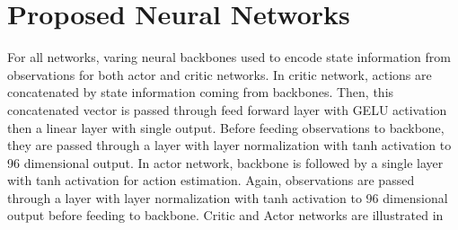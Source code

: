 \section{Proposed Neural Networks}
\label{sec:proposed_networks}

For all networks, varing neural backbones used to encode state information from observations for both actor and critic networks. 
In critic network, actions are concatenated by state information coming from backbones. 
Then, this concatenated vector is passed through feed forward layer with GELU activation then a linear layer with single output. 
Before feeding observations to backbone, they are passed through a layer with layer normalization with tanh activation to 96 dimensional output. 
In actor network, backbone is followed by a single layer with tanh activation for action estimation. 
Again, observations are passed through a layer with layer normalization with tanh activation to 96 dimensional output before feeding to backbone. 
Critic and Actor networks are illustrated in  

